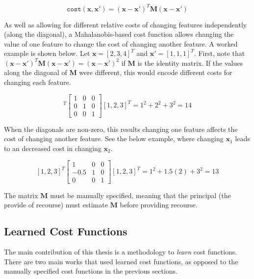 \begin{equation} \label{eq:mahalanobis_distance}
	\texttt{cost}(\mathbf{x}, \mathbf{x}') = (\mathbf{x} -\mathbf{x}')^T\mathbf{M}(\mathbf{x} - \mathbf{x}')
\end{equation}

As well as allowing for different relative costs of changing features independently (along the diagonal), a Mahalanobis-based cost function allows changing the value of one feature to change the cost of changing another feature. A worked example is shown below. Let $\mathbf{x} = [2,3,4]^T$ and $\mathbf{x}' = [1,1,1]^T$. First, note that $(\mathbf{x} -\mathbf{x}')^T\mathbf{M}(\mathbf{x} - \mathbf{x}') = (\mathbf{x} -\mathbf{x}')^2$ if $\mathbf{M}$ is the identity matrix. If the values along the diagonal of $\mathbf{M}$ were different, this would encode different costs for changing each feature.

\begin{equation}
	[1, 2, 3]^T \left[\begin{array}{lllll}
		1 & 0 & 0 \\
		0 & 1 & 0 \\
		0 & 0 & 1
	\end{array}\right] [1, 2, 3]^T = 1^2 + 2^2 + 3^2 = 14
\end{equation}

When the diagonals are non-zero, this results changing one feature affects the cost of changing another feature. See the below example, where changing $\mathbf{x}_1$ leads to an decreased cost in changing $\mathbf{x}_2$.

\begin{equation} \label{eq:mahalanobis_example}
	[1, 2, 3]^T \left[\begin{array}{lllll}
		1 & 0 & 0 \\
		-0.5 & 1 & 0 \\
		0 & 0 & 1
	\end{array}\right] [1, 2, 3]^T = 1^2 + 1.5(2) + 3^2 = 13
\end{equation}

The matrix $\mathbf{M}$ must be manually specified, meaning that the principal (the provide of recourse) must estimate $\mathbf{M}$ before providing recourse.

\subsection{Learned Cost Functions}

The main contribution of this thesis is a methodology to \textit{learn} cost functions. There are two main works that used learned cost functions, as opposed to the manually specified cost functions in the previous sections.\\

